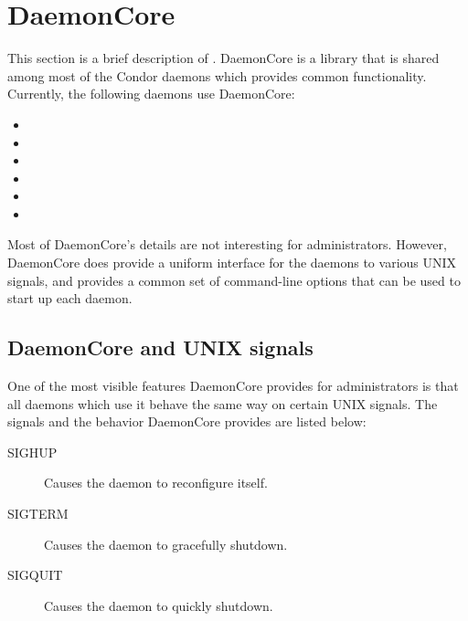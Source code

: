 \section{\label{sec:DaemonCore}DaemonCore}

This section is a brief description of .  DaemonCore
is a library that is shared among most of the Condor daemons which
provides common functionality.  Currently, the following daemons use
DaemonCore:

\begin{itemize}
\item {}
\item {}
\item {}
\item {}
\item {}
\item {}
\end{itemize}

Most of DaemonCore's details are not interesting for administrators.
However, DaemonCore does provide a uniform interface for the daemons
to various UNIX signals, and provides a common set of command-line
options that can be used to start up each daemon.

\subsection{\label{sec:DaemonCore-Signals}DaemonCore and UNIX signals}

One of the most visible features DaemonCore provides for
administrators is that all daemons which use it behave the same way on
certain UNIX signals.  The signals and the behavior DaemonCore
provides are listed below:

\begin{description}
\item[SIGHUP] Causes the daemon to reconfigure itself.
\item[SIGTERM] Causes the daemon to gracefully shutdown.
\item[SIGQUIT] Causes the daemon to quickly shutdown.
\end{description}


